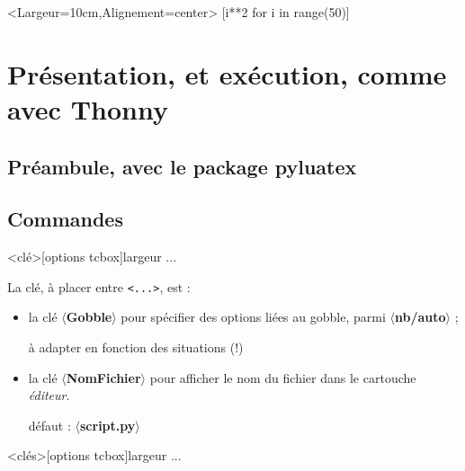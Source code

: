 \documentclass[french,a4paper,10pt]{article}
\begin{document}
\begin{ConsolePiton}<Largeur=10cm,Alignement=center>{}
[i**2 for i in range(50)]
\end{ConsolePiton}

\pagebreak

\section{Présentation, et exécution, comme avec Thonny}

\subsection{Préambule, avec le package pyluatex}

{\small {}}

\subsection{Commandes}

{\small \begin{codehigh}
\begin{PitonThonnyEditor}<clé>[options tcbox]{largeur}
...
\end{PitonThonnyEditor}
\end{codehigh}}

\medskip

La clé, à placer entre \texttt{<...>}, est :

\begin{itemize}
	\item la clé \textbf{\textsf{$\langle$Gobble$\rangle$}} pour spécifier des options liées au \textsf{gobble}, parmi \textbf{\textsf{$\langle$nb/auto$\rangle$}} ;
	
	\hfill{}à adapter en fonction des situations (!)
	\item la clé \textbf{\textsf{$\langle$NomFichier$\rangle$}} pour afficher le nom du fichier dans le cartouche \textit{éditeur}.
	
	\hfill{}défaut : \textbf{\textsf{$\langle$script.py$\rangle$}}
\end{itemize}

{\small \begin{codehigh}
\begin{PitonThonnyConsole}<clés>[options tcbox]{largeur}
...
\end{PitonThonnyConsole}
\end{codehigh}}
\end{document}
